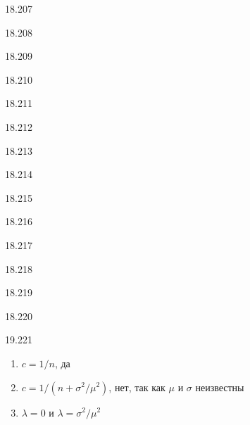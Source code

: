 \protect \hypertarget {soln:18.207}{}
\begin{solution}{{18.207}}
\end{solution}
\protect \hypertarget {soln:18.208}{}
\begin{solution}{{18.208}}
\end{solution}
\protect \hypertarget {soln:18.209}{}
\begin{solution}{{18.209}}
\end{solution}
\protect \hypertarget {soln:18.210}{}
\begin{solution}{{18.210}}
\end{solution}
\protect \hypertarget {soln:18.211}{}
\begin{solution}{{18.211}}
\end{solution}
\protect \hypertarget {soln:18.212}{}
\begin{solution}{{18.212}}
\end{solution}
\protect \hypertarget {soln:18.213}{}
\begin{solution}{{18.213}}
\end{solution}
\protect \hypertarget {soln:18.214}{}
\begin{solution}{{18.214}}
\end{solution}
\protect \hypertarget {soln:18.215}{}
\begin{solution}{{18.215}}
\end{solution}
\protect \hypertarget {soln:18.216}{}
\begin{solution}{{18.216}}
\end{solution}
\protect \hypertarget {soln:18.217}{}
\begin{solution}{{18.217}}
\end{solution}
\protect \hypertarget {soln:18.218}{}
\begin{solution}{{18.218}}
\end{solution}
\protect \hypertarget {soln:18.219}{}
\begin{solution}{{18.219}}
\end{solution}
\protect \hypertarget {soln:18.220}{}
\begin{solution}{{18.220}}
\end{solution}
\protect \hypertarget {soln:19.221}{}
\begin{solution}{{19.221}}
    \begin{enumerate}
      \item $c=1/n$, да
      \item $c=1/(n+\sigma^2/\mu^2)$, нет, так как $\mu$ и $\sigma$ неизвестны
      \item $\lambda=0$ и $\lambda=\sigma^2/\mu^2$
    \end{enumerate}
  
\end{solution}
